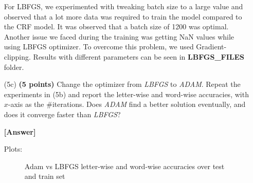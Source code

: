 \documentclass[11pt]{report}
\begin{document}
\begin{itemize}
{For LBFGS, we experimented with tweaking batch size to a large value and observed that a lot more data was required to train the model compared to the CRF model. It was observed that a batch size of 1200 was optimal. Another issue we faced during the training was getting NaN values while using LBFGS optimizer. To overcome this problem, we used Gradient-clipping. Results with different parameters can be seen in \textbf{LBFGS\_FILES} folder.
}
           
  
\item[(5c)] {\bf (5 points)} Change the optimizer from {\em LBFGS} to {\em
    ADAM}. Repeat the experiments in (5b) and report the letter-wise and
  word-wise accuracies, with \(x\)-axis as the \#iterations. Does {\em ADAM} find
  a better solution eventually, and does it converge faster than {\em LBFGS}?

\item[\textbf{[Answer]} ]{
Plots:
    \begin{figure}[H]
            	\centering
                \caption{Adam vs LBFGS letter-wise and word-wise accuracies over test and train set }
            	\label{fig:compare_optimizer}
            \end{figure}
    
}
\end{itemize}
\end{document}
